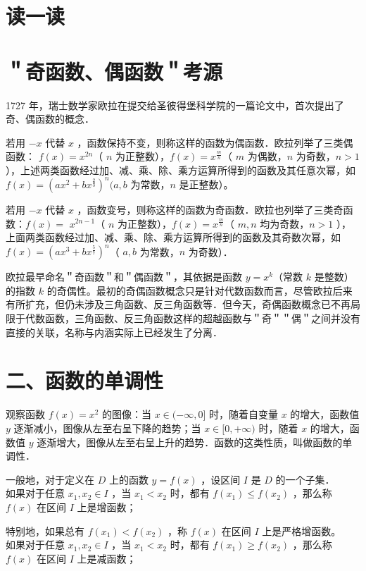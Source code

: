 \documentclass[10pt]{article}
\begin{document}
\section*{读一读}
\section*{＂奇函数、偶函数＂考源}
1727 年，瑞士数学家欧拉在提交给圣彼得堡科学院的一篇论文中，首次提出了奇、偶函数的概念．

若用 \(-x\) 代替 \(x\) ，函数保持不变，则称这样的函数为偶函数．欧拉列举了三类偶函数： \(f(x)=x^{2 n}\)（ \(n\) 为正整数），\(f(x)=x^{\frac{m}{n}}\)（ \(m\) 为偶数，\(n\) 为奇数，\(n>1\) ），上述两类函数经过加、减、乘、除、乘方运算所得到的函数及其任意次幂，如 \(f(x)=\left(a x^{2}+b x^{\frac{2}{3}}\right)^{n}(a, b\) 为常数，\(n\) 是正整数）。

若用 \(-x\) 代替 \(x\) ，函数变号，则称这样的函数为奇函数．欧拉也列举了三类奇函数：\(f(x)=\) \(x^{2 n-1}\)（ \(n\) 为正整数），\(f(x)=x^{\frac{m}{n}}\)（ \(m, n\) 均为奇数，\(n>1\) ），上面两类函数经过加、减、乘、除、乘方运算所得到的函数及其奇数次幂，如 \(f(x)=\left(a x^{3}+b x^{\frac{5}{7}}\right)^{n}\)（ \(a, b\) 为常数，\(n\) 为奇数）．

欧拉最早命名＂奇函数＂和＂偶函数＂，其依据是函数 \(y=x^{k}\)（常数 \(k\) 是整数）的指数 \(k\) 的奇偶性。最初的奇偶函数概念只是针对代数函数而言，尽管欧拉后来有所扩充，但仍未涉及三角函数、反三角函数等．但今天，奇偶函数概念已不再局限于代数函数，三角函数、反三角函数这样的超越函数与＂奇＂＂偶＂之间并没有直接的关联，名称与内涵实际上已经发生了分离．

\section*{二、函数的单调性}
观察函数 \(f(x)=x^{2}\) 的图像：当 \(x \in(-\infty, 0]\) 时，随着自变量 \(x\) 的增大，函数值 \(y\) 逐渐减小，图像从左至右呈下降的趋势；当 \(x \in[0,+\infty)\) 时，随着 \(x\) 的增大，函数值 \(y\) 逐渐增大，图像从左至右呈上升的趋势．函数的这类性质，叫做函数的单调性．

一般地，对于定义在 \(D\) 上的函数 \(y=f(x)\) ，设区间 \(I\) 是 \(D\) 的一个子集．\\
如果对于任意 \(x_{1}, x_{2} \in I\) ，当 \(x_{1}<x_{2}\) 时，都有 \(f\left(x_{1}\right) \leqslant f\left(x_{2}\right)\) ，那么称 \(f(x)\) 在区间 \(I\) 上是增函数；

特别地，如果总有 \(f\left(x_{1}\right)<f\left(x_{2}\right)\) ，称 \(f(x)\) 在区间 \(I\) 上是严格增函数。\\
如果对于任意 \(x_{1}, x_{2} \in I\) ，当 \(x_{1}<x_{2}\) 时，都有 \(f\left(x_{1}\right) \geqslant f\left(x_{2}\right)\) ，那么称 \(f(x)\) 在区间 \(I\) 上是减函数；
\end{document}
